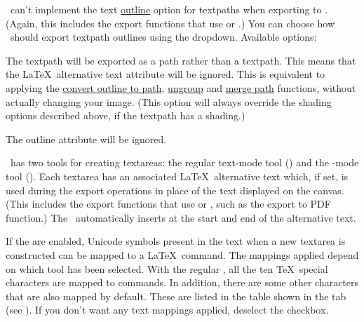 
\FlowframTk\ can't implement the text
\hyperref[sec:textoutline]{outline} option for
\glspl{textpath} when exporting to . (Again, this
includes the export functions that use  or .)
You can choose how \FlowframTk\ should export \gls{textpath}
outlines using the 
\gls*{dropdown}. Available options:

\begin{deflist}
\itemtitle
 {}

\begin{itemdesc}
The \gls{textpath} will be exported as a path rather than a
\gls{textpath}. This means that the \LaTeX\
alternative text attribute will be ignored. This is equivalent to
applying the
\hyperref[sec:outlinetopath]{convert outline to path}, 
\hyperref[sec:grouping]{ungroup} and 
\hyperref[sec:mergepaths]{merge path}
functions, without actually changing your image.
(This option will always override the shading options described
above, if the \gls{textpath} has a shading.)
\end{itemdesc}

\itemtitle
 {}

\begin{itemdesc}
The outline attribute will be ignored.
\end{itemdesc}

\end{deflist}

%
%
\FlowframTk\ has two tools for creating \glspl{textarea}: the
regular text-mode tool () and the
-mode tool (). Each \gls{textarea} has an
associated \LaTeX\ alternative text which, if set, is used
during the  export operations in place of the
text displayed on the \gls{canvas}. (This includes the export
functions that use  or , such as
the export to PDF function.) The \mathstool\ automatically
inserts  at the start and end of the
alternative text. 


If the  are enabled, Unicode symbols present in
the text when a new \gls*{textarea} is constructed can be mapped to
a \LaTeX\ command.
The mappings applied depend on which tool has been selected. With
the regular \texttool, all the ten \TeX\ special characters are
mapped to commands. In addition, there are some other characters
that are also mapped by default. These are listed in the table shown
in the \widget{textconfig.textmappings} tab (see
). If you don't want any
text mappings applied, deselect the
 \gls{checkbox}.

